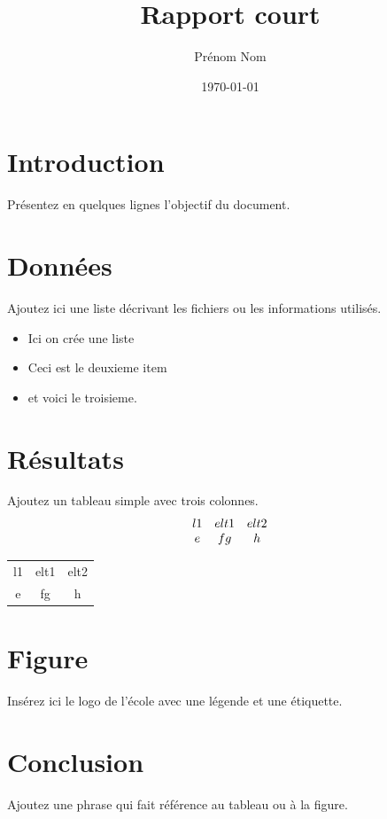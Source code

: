 \documentclass[a4paper,11pt]{article}
\title{Rapport court}
\author{Prénom Nom}
\date{\today}
\begin{document}
\maketitle
\tableofcontents

\section{Introduction}

Présentez en quelques lignes l'objectif du document.

\section{Données}

Ajoutez ici une liste décrivant les fichiers ou les informations utilisés.

\begin{itemize}
    \item Ici on crée une liste
    \item Ceci est le deuxieme item 
    \item et voici le troisieme.
\end{itemize}

\section{Résultats}

Ajoutez un tableau simple avec trois colonnes.
\[
\begin{array}{c c c}
    l1 & elt1 & elt2 \\
    e  & fg   & h
\end{array}
\]

\begin{tabular}{c c c}
    l1 & elt1 & elt2
    \\
    e  & fg   & h    
\end{tabular}

\section{Figure}

Insérez ici le logo de l'école avec une légende et une étiquette.

\section{Conclusion}

Ajoutez une phrase qui fait référence au tableau ou à la figure.
\end{document}
